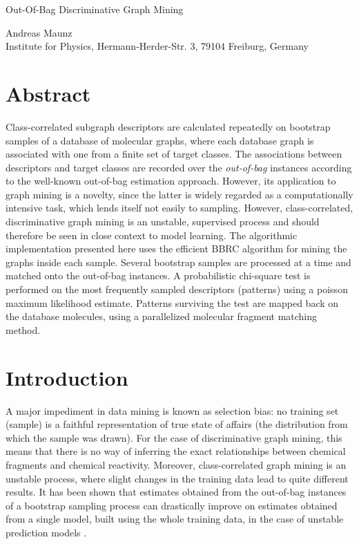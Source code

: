 \documentclass{article}
\begin{document}

\begin{center}
\begin{huge}Out-Of-Bag Discriminative Graph Mining\end{huge}

Andreas Maunz \\Institute for Physics, Hermann-Herder-Str. 3, 79104 Freiburg, Germany
\end{center}

\section{Abstract}
Class-correlated subgraph descriptors are calculated repeatedly on bootstrap samples of a database of molecular graphs, where each database graph is associated with one from a finite set of target classes. 
The associations between descriptors and target classes are recorded over the \emph{out-of-bag} instances according to the well-known out-of-bag estimation approach. However, its application to graph mining is a novelty, since the latter is widely regarded as a computationally intensive task, which lends itself not easily to sampling. 
However, class-correlated, discriminative graph mining is an unstable, supervised process and should therefore be seen in close context to model learning.
The algorithmic implementation presented here uses  the efficient BBRC algorithm for mining the graphs inside each sample. Several bootstrap samples are processed at a time and matched onto the out-of-bag instances.  
A probabilistic chi-square test is performed on the most frequently sampled descriptors (patterns) using a poisson maximum likelihood estimate.
Patterns surviving the test are mapped back on the database molecules, using a parallelized molecular fragment matching method.

\section{Introduction}
A major impediment in data mining is known as selection bias: no training set (sample) is a faithful representation of true state of affairs (the distribution from which the sample was drawn). For the case of discriminative graph mining, this means that there is no way of inferring the exact relationships between chemical fragments and chemical reactivity. Moreover, class-correlated graph mining is an unstable process, where slight changes in the training data lead to quite different results. 
It has been shown that estimates obtained from the out-of-bag instances of a bootstrap sampling process can drastically improve on estimates obtained from a single model, built using the whole training data, in the case of unstable prediction models \cite{breiman96oob}.
\end{document}
